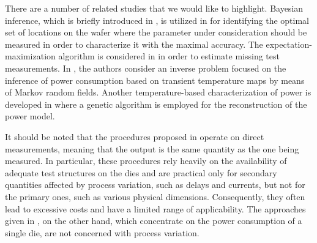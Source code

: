 There are a number of related studies that we would like to highlight. Bayesian
inference, which is briefly introduced in , is
utilized in \cite{zhang2010} for identifying the optimal set of locations on the
wafer where the parameter under consideration should be measured in order to
characterize it with the maximal accuracy. The expectation-maximization
algorithm is considered in \cite{reda2009} in order to estimate missing test
measurements. In \cite{paek2012}, the authors consider an inverse problem
focused on the inference of power consumption based on transient temperature
maps by means of Markov random fields. Another temperature-based
characterization of power is developed in \cite{mesa-martinez2007} where a
genetic algorithm is employed for the reconstruction of the power model.

It should be noted that the procedures proposed in \cite{reda2009, zhang2010}
operate on direct measurements, meaning that the output is the same quantity as
the one being measured. In particular, these procedures rely heavily on the
availability of adequate test structures on the dies and are practical only for
secondary quantities affected by process variation, such as delays and currents,
but not for the primary ones, such as various physical dimensions. Consequently,
they often lead to excessive costs and have a limited range of applicability.
The approaches given in \cite{mesa-martinez2007, paek2012}, on the other hand,
which concentrate on the power consumption of a single die, are not concerned
with process variation.

